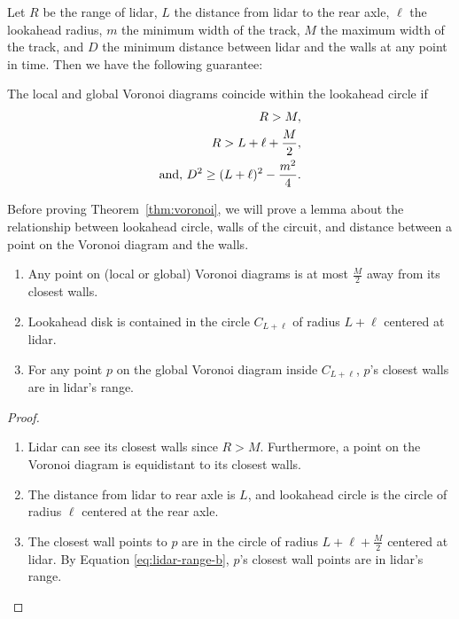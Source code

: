 Let $R$ be the range of lidar, 
$L$ the distance from lidar to the rear axle,
$\ell$ the lookahead radius,
$m$ the minimum width of the track,
$M$ the maximum width of the track,
and $D$ the minimum distance between lidar and the walls at any point in time.
Then we have the following guarantee:

\begin{theorem}
The local and global Voronoi diagrams coincide within the lookahead circle if
\begin{align}
    R > M, \\
    R > L + \ell + \frac{M}{2}, \label{eq:lidar-range-b} \\
    \textnormal{and,  } D^2 \geq (L+\ell)^2-\frac{m^2}{4}.\label{eq:lidar-wall-distance}
\end{align}
\label{thm:voronoi}
\end{theorem}

Before proving Theorem~\ref{thm:voronoi}, we will prove a lemma about the relationship between lookahead circle, walls of the circuit, and distance between a point on the Voronoi diagram and the walls.

\begin{lemma}
\begin{enumerate}
\item Any point on (local or global) Voronoi diagrams is at most $\frac{M}{2}$ away from its closest walls.
\item Lookahead disk is contained in the circle $C_{L+\ell}$ of radius $L+\ell$ centered at lidar.
\item For any point $p$ on the global Voronoi diagram inside $C_{L+\ell}$, $p$'s closest walls are in lidar's range.
\end{enumerate}
\end{lemma}
\begin{proof}
\begin{enumerate}
    \item 
    Lidar can see its closest walls since $R>M$. Furthermore, a point on the Voronoi diagram is equidistant to its closest walls.
    \item
    The distance from lidar to rear axle is $L$, and lookahead circle is the circle of radius $\ell$ centered at the rear axle.
    \item
    The closest wall points to $p$ are in the circle of radius $L+\ell+\frac{M}{2}$ centered at lidar. By Equation \ref{eq:lidar-range-b}, $p$'s closest wall points are in lidar's range.
\end{enumerate}
\end{proof}

